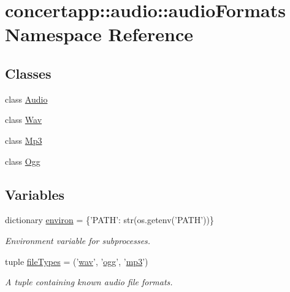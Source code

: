 \hypertarget{namespaceconcertapp_1_1audio_1_1audio_formats}{
\section{concertapp::audio::audioFormats Namespace Reference}
\label{namespaceconcertapp_1_1audio_1_1audio_formats}
}
\subsection*{Classes}
\begin{DoxyCompactItemize}
\item 
class \hyperlink{classconcertapp_1_1audio_1_1audio_formats_1_1_audio}{Audio}
\item 
class \hyperlink{classconcertapp_1_1audio_1_1audio_formats_1_1_wav}{Wav}
\item 
class \hyperlink{classconcertapp_1_1audio_1_1audio_formats_1_1_mp3}{Mp3}
\item 
class \hyperlink{classconcertapp_1_1audio_1_1audio_formats_1_1_ogg}{Ogg}
\end{DoxyCompactItemize}
\subsection*{Variables}
\begin{DoxyCompactItemize}
\item 
dictionary \hyperlink{namespaceconcertapp_1_1audio_1_1audio_formats_a3d9b8f69139bf0a6fce9d1d585974039}{environ} = \{'PATH': str(os.getenv('PATH'))\}
\begin{DoxyCompactList}\small\item\em Environment variable for subprocesses. \item\end{DoxyCompactList}\item 
tuple \hyperlink{namespaceconcertapp_1_1audio_1_1audio_formats_a3e84815c81164317725d83ae9e1af87e}{fileTypes} = ('\hyperlink{classwav}{wav}', '\hyperlink{classogg}{ogg}', '\hyperlink{classmp3}{mp3}')
\begin{DoxyCompactList}\small\item\em A tuple containing known audio file formats. \item\end{DoxyCompactList}\end{DoxyCompactItemize}


